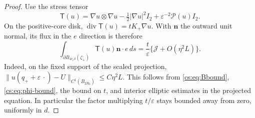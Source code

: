 \documentclass[11pt,reqno]{amsart}
\numberwithin{equation}{section}
\theoremstyle{definition}
\theoremstyle{remark}
\newcommand{\eps}{\varepsilon}
\begin{document}
\begin{proof}
Use the stress tensor
\[
 \mathsf T(u)=\nabla u\otimes\nabla u-\tfrac12|\nabla u|^2I_2
                              +\eps^{-2}\mathcal P(u)I_2 .
\]
On the positive-core disk,
$\operatorname{div}\mathsf T(u)=tK_+\nabla u$.
With $\boldsymbol n$ the outward unit normal, its flux in the $e$
direction is therefore
\begin{equation}\label{cs:eq:stressrhs}
 \int_{\partial B_{4r_c\delta}(\zeta_+)}\mathsf T(u)\boldsymbol n\cdot e\,ds
       =\frac{t}{\eps}\{\mathcal J+O(\eta^2L)\}.
\end{equation}
Indeed, on the fixed support of the scaled projection,
\(\|u(q_++\eps\,\cdot)-U\|_{C^1(B_{2R_0})}\le C\eta^2L.\)
This follows from \eqref{cs:eq:Bbound}, \eqref{cs:eq:phi-bound},
the bound on $t$, and interior elliptic estimates in the projected
equation. In particular the factor multiplying $t/\eps$ stays
bounded away from zero, uniformly in $d$.


\end{proof}
\end{document}
